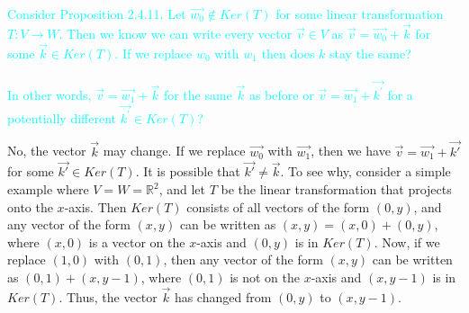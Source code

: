 \documentclass[fontsize=12pt]{scrartcl}
\begin{document}
\vspace{3 in}

\noindent
\textcolor{cyan}{Consider Proposition 2.4.11. Let $\vec{w_0} \notin Ker(T)$ for some linear transformation $T: V \to W$. Then we know we can write every vector $\vec{v} \in V$ as $\vec{v} = \vec{w_0} + \vec{k}$ for some $\vec{k} \in Ker(T)$. If we replace $w_0$ with $w_1$ then does $k$ stay the same?}\\
\\
\textcolor{cyan}{In other words, $\vec{v} = \vec{w_1} + \vec{k}$ for the same $\vec{k}$ as before or $\vec{v} = \vec{w_1} + \vec{k^{\prime}}$ for a potentially different $\vec{k^{\prime}} \in Ker(T)$?}

\noindent
No, the vector $\vec{k}$ may change. If we replace $\vec{w_0}$ with $\vec{w_1}$, then we have $\vec{v} = \vec{w_1} + \vec{k'}$ for some $\vec{k'} \in Ker(T)$. It is possible that $\vec{k'} \neq \vec{k}$. To see why, consider a simple example where $V=W=\mathbb{R}^2$, and let $T$ be the linear transformation that projects onto the $x$-axis. Then $Ker(T)$ consists of all vectors of the form $(0, y)$, and any vector of the form $(x, y)$ can be written as $(x, y) = (x, 0) + (0, y)$, where $(x, 0)$ is a vector on the $x$-axis and $(0, y)$ is in $Ker(T)$. Now, if we replace $(1, 0)$ with $(0, 1)$, then any vector of the form $(x, y)$ can be written as $(0, 1) + (x, y-1)$, where $(0, 1)$ is not on the $x$-axis and $(x, y-1)$ is in $Ker(T)$. Thus, the vector $\vec{k}$ has changed from $(0, y)$ to $(x, y-1)$.
\end{document}

